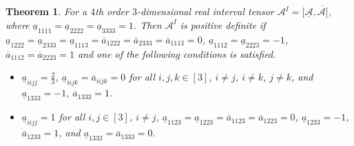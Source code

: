 \documentclass[twoside]{article}
\newtheorem{theorem}{Theorem}[section]
\begin{document}
\begin{theorem}\label{th3.4}
For a $4$th order $3$-dimensional real interval tensor ${\mathcal{A}}^I=[\underline{\mathcal{A}},\overline{\mathcal{A}]}$, where  $\underline{a}_{1111}=\underline{a}_{2222}=\underline{a}_{3333}=1$. Then ${\mathcal{A}}^I$ is positive definite if $\underline{a}_{1222}=\underline{a}_{2333}=\underline{a}_{1113}=\overline{a}_{1222}=\overline{a}_{2333}=\overline{a}_{1113}=0$, $\underline{a}_{1112}=\underline{a}_{2223}=-1$, $\overline{a}_{1112}=\overline{a}_{2223}=1$ and one of the following conditions is satisfied.
\begin{itemize}
  \item [(a)] $\underline{a}_{iijj}=\frac{2}{3}$, $\underline{a}_{iijk}=\overline{a}_{iijk}=0$ for all $i,j,k\in[3]$, $i\neq j$, $i\neq k$, $j\neq k$, and $\underline{a}_{1333}=-1$, $\overline{a}_{1333}=1$.
   \item [(b)] $\underline{a}_{iijj}=1$ for all $i,j\in[3]$, $i\neq j$, $\underline{a}_{1123}=\underline{a}_{1223}=\overline{a}_{1123}=\overline{a}_{1223}=0$, $\underline{a}_{1233}=-1$, $\overline{a}_{1233}=1$, and $\underline{a}_{1333}=\overline{a}_{1333}=0$.
 \end{itemize}
\end{theorem}
\end{document}
